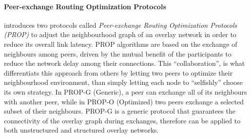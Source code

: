 %
%
%

\paragraph*{\bf Peer-exchange Routing Optimization Protocols}
\cite{qiu_prop_2007} introduces two protocols called \emph{Peer-exchange Routing
Optimization Protocols (PROP)} to adjust the neighbourhood graph of an overlay
network in order to reduce its overall link latency. PROP algorithms are based
on the exchange of neighbours among peers, driven by the mutual benefit of the
participants to reduce the network delay among their connections. This
``collaboration'', is what differentiats this approach from others by letting
two peers to optimize their neighbourhood environment, than simply letting each
node to ``selfishly'' choose its own strategy. In PROP-G (Generic), a peer can
exchange all of its neighbours with another peer, while in PROP-O (Optimized)
two peers exchange a selected subset of their neighbours. PROP-G is a generic
protocol that guarantees the connectivity of the overlay graph during exchanges,
therefore can be applied to both unstructured and structured overlay networks.

